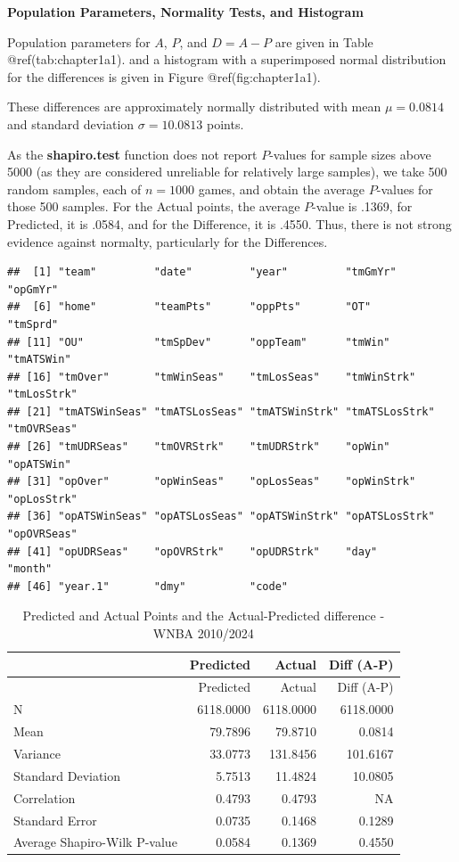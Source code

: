\documentclass[
]{book}
\begin{document}
\textbf{Population Parameters, Normality Tests, and Histogram}

Population parameters for \(A\), \(P\), and \(D=A-P\) are given in Table
@ref(tab:chapter1a1). and a histogram with a superimposed normal
distribution for the differences is given in Figure
@ref(fig:chapter1a1).

These differences are approximately normally distributed with mean
\(\mu=0.0814\) and standard deviation \(\sigma=10.0813\) points.

As the \textbf{shapiro.test} function does not report \(P\)-values for
sample sizes above 5000 (as they are considered unreliable for
relatively large samples), we take 500 random samples, each of
\(n=1000\) games, and obtain the average \(P\)-values for those 500
samples. For the Actual points, the average \(P\)-value is .1369, for
Predicted, it is .0584, and for the Difference, it is .4550. Thus, there
is not strong evidence against normalty, particularly for the
Differences.

\begin{verbatim}
##  [1] "team"         "date"         "year"         "tmGmYr"       "opGmYr"      
##  [6] "home"         "teamPts"      "oppPts"       "OT"           "tmSprd"      
## [11] "OU"           "tmSpDev"      "oppTeam"      "tmWin"        "tmATSWin"    
## [16] "tmOver"       "tmWinSeas"    "tmLosSeas"    "tmWinStrk"    "tmLosStrk"   
## [21] "tmATSWinSeas" "tmATSLosSeas" "tmATSWinStrk" "tmATSLosStrk" "tmOVRSeas"   
## [26] "tmUDRSeas"    "tmOVRStrk"    "tmUDRStrk"    "opWin"        "opATSWin"    
## [31] "opOver"       "opWinSeas"    "opLosSeas"    "opWinStrk"    "opLosStrk"   
## [36] "opATSWinSeas" "opATSLosSeas" "opATSWinStrk" "opATSLosStrk" "opOVRSeas"   
## [41] "opUDRSeas"    "opOVRStrk"    "opUDRStrk"    "day"          "month"       
## [46] "year.1"       "dmy"          "code"
\end{verbatim}

\begin{longtable}[]{@{}lrrr@{}}
\caption{Predicted and Actual Points and the Actual-Predicted difference
- WNBA 2010/2024}\tabularnewline
\toprule\noalign{}
& Predicted & Actual & Diff (A-P) \\
\midrule\noalign{}
\endfirsthead
\toprule\noalign{}
& Predicted & Actual & Diff (A-P) \\
\midrule\noalign{}
\endhead
\bottomrule\noalign{}
\endlastfoot
N & 6118.0000 & 6118.0000 & 6118.0000 \\
Mean & 79.7896 & 79.8710 & 0.0814 \\
Variance & 33.0773 & 131.8456 & 101.6167 \\
Standard Deviation & 5.7513 & 11.4824 & 10.0805 \\
Correlation & 0.4793 & 0.4793 & NA \\
Standard Error & 0.0735 & 0.1468 & 0.1289 \\
Average Shapiro-Wilk P-value & 0.0584 & 0.1369 & 0.4550 \\
\end{longtable}
\end{document}
